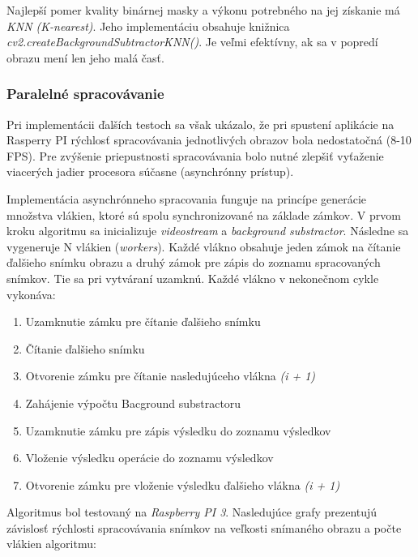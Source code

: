 Najlepší pomer kvality binárnej masky a výkonu potrebného na jej získanie má \textit{KNN (K-nearest)}. Jeho implementáciu obsahuje knižnica  \textit{cv2.createBackgroundSubtractorKNN()}. Je veľmi efektívny, ak sa v popredí obrazu mení len jeho malá časť. 

\subsubsection{Paralelné spracovávanie}
Pri implementácii ďalších testoch sa však ukázalo, že pri spustení aplikácie na Rasperry PI rýchlosť spracovávania jednotlivých obrazov bola nedostatočná (8-10 FPS). Pre zvýšenie priepustnosti spracovávania bolo nutné zlepšiť vyťaženie viacerých jadier procesora súčasne (asynchrónny prístup). 

Implementácia asynchrónneho spracovania funguje na princípe generácie množstva vlákien, ktoré sú spolu synchronizované na základe zámkov. V prvom kroku algoritmu sa inicializuje \textit{videostream} a \textit{background substractor}. Následne sa vygeneruje N vlákien (\textit{workers}). Každé vlákno obsahuje jeden zámok na čítanie ďalšieho snímku obrazu a druhý zámok pre zápis do zoznamu spracovaných snímkov. Tie sa pri vytváraní uzamknú. Každé vlákno v nekonečnom cykle vykonáva:
\begin{enumerate}
\item Uzamknutie zámku pre čítanie ďalšieho snímku
\item Čítanie ďalšieho snímku 
\item Otvorenie zámku pre čítanie nasledujúceho vlákna \textit{(i + 1)}
\item Zahájenie výpočtu Bacground substractoru
\item Uzamknutie zámku pre zápis výsledku do zoznamu výsledkov
\item Vloženie výsledku operácie do zoznamu výsledkov 
\item Otvorenie zámku pre vloženie výsledku ďalšieho vlákna \textit{(i + 1)} 
\end{enumerate}

Algoritmus bol testovaný na \textit{Raspberry PI 3}. Nasledujúce grafy prezentujú závislosť rýchlosti spracovávania snímkov na veľkosti snímaného obrazu a počte vlákien algoritmu:

